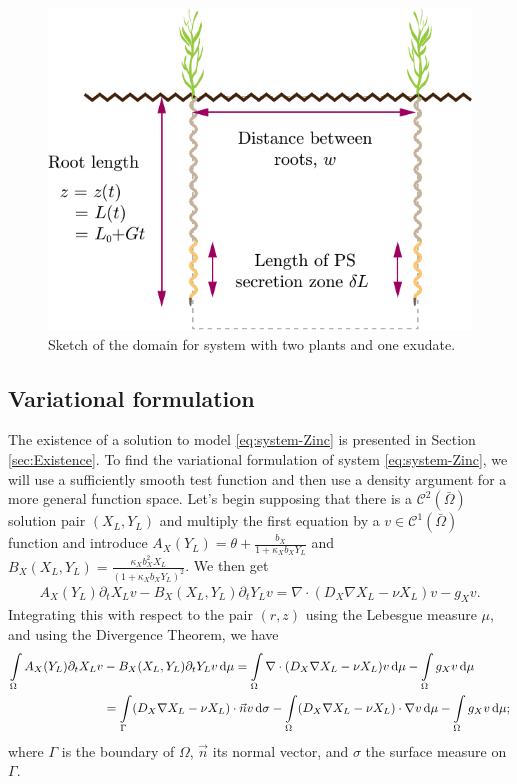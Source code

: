 \documentclass[11pt]{article}
\numberwithin{equation}{section}
\begin{document}
\begin{figure}[h]
    \centering
    \includegraphics[scale=0.7]{Figures/Second-plot.pdf}
    \caption{Sketch of the domain for system with two plants and one exudate.}
    \label{fig:system-Zinc}
\end{figure}

\subsection{Variational formulation}


The existence of a solution to model \eqref{eq:system-Zinc} is presented in Section \ref{sec:Existence}.
To find the variational formulation of system \eqref{eq:system-Zinc}, we will use a sufficiently smooth test function and then use a density argument for a more general function space. Let's begin supposing that there is a $\mathcal{C}^2 (\bar \Omega)$ solution pair $(X_L,Y_L)$ and multiply the first equation by a $v \in \mathcal{C}^1 (\bar\Omega)$ function and introduce $A_X(Y_L) = \theta + \frac{b_X}{1 + \kappa_X b_X Y_L}$ and $B_X(X_L,Y_L) = \frac{\kappa_X b_X^2 X_L}{(1+\kappa_X b_X Y_L)^2}$. We then get
\begin{align}
    A_X(Y_L) \partial_t X_L v - B_X(X_L,Y_L) \partial_t Y_L v = \nabla \cdot (D_X \nabla X_L - \nu X_L) v - g_X v.
\end{align}
Integrating this with respect to the pair \((r,z)\) using the Lebesgue measure \(\mu\), and using the Divergence Theorem, we have
\begin{align}
    \int\limits_\Omega
    A_X(Y_L) \partial_t X_L v &- B_X(X_L,Y_L) \partial_t Y_L v \dif \mu = 
    \int\limits_\Omega
    \nabla \cdot (D_X \nabla X_L - \nu X_L) v  \dif \mu
    -\int\limits_\Omega g_X v \dif \mu
    \\
    &=
    \int\limits_\Gamma
    (D_X \nabla X_L - \nu X_L) \cdot \vec{n} v
    \dif \sigma
    -\int\limits_\Omega
    (D_X \nabla X_L - \nu X_L) \cdot \nabla v  \dif \mu
    -\int\limits_\Omega g_X v \dif \mu;
\end{align}
where $\Gamma$ is the boundary of $\Omega$, $\vec{n}$ its normal vector, and $\sigma$ the surface measure on $\Gamma$. 
\end{document}

